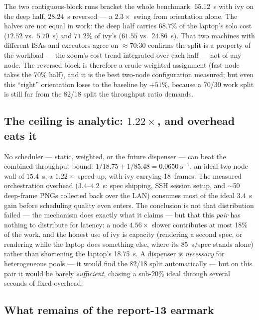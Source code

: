 \documentclass[
	english,
	letterpaper, oneside
]{article}
\begin{document}
The two contiguous-block runs bracket the whole benchmark: $65.12$~s with
ivy on the deep half, $28.24$~s reversed --- a $2.3\times$ swing from
orientation alone. The halves are not equal in work: the deep half carries
$68.7\%$ of the laptop's solo cost ($12.52$ vs.\ $5.70$~s) and $71.2\%$ of
ivy's ($61.55$ vs.\ $24.86$~s). That two machines with different ISAs and
executors agree on $\approx$70:30 confirms the split is a property of the
workload --- the zoom's cost trend integrated over each half --- not of any
node. The reversed block is therefore a crude weighted assignment (fast
node takes the 70\% half), and it is the best two-node configuration
measured; but even this ``right'' orientation loses to the baseline by
$+51\%$, because a 70/30 work split is still far from the 82/18 split the
throughput ratio demands.

\subsection{The ceiling is analytic: $1.22\times$, and overhead eats it}
\label{sec:ceiling}

No scheduler --- static, weighted, or the future dispenser --- can beat the
combined throughput bound: $1/18.75 + 1/85.48 = 0.0650\;\mathrm{s^{-1}}$,
an ideal two-node wall of $15.4$~s, a $1.22\times$ speed-up, with ivy
carrying 18~frames. The measured orchestration overhead ($3.4$--$4.2$~s:
spec shipping, SSH session setup, and $\sim$50 deep-frame PNGs collected
back over the LAN) consumes most of the ideal $3.4$~s gain before
scheduling quality even enters. The conclusion is not that distribution
failed --- the mechanism does exactly what it claims --- but that this
\emph{pair} has nothing to distribute for latency: a node $4.56\times$
slower contributes at most 18\% of the work, and the honest use of ivy is
capacity (rendering a second spec, or rendering while the laptop does
something else, where its 85~s/spec stands alone) rather than shortening
the laptop's 18.75~s. A dispenser is \emph{necessary} for heterogeneous
pools --- it would find the 82/18 split automatically --- but on this pair
it would be barely \emph{sufficient}, chasing a sub-20\% ideal through
several seconds of fixed overhead.

\subsection{What remains of the report-13 earmark}
\label{sec:earmark}
\end{document}

